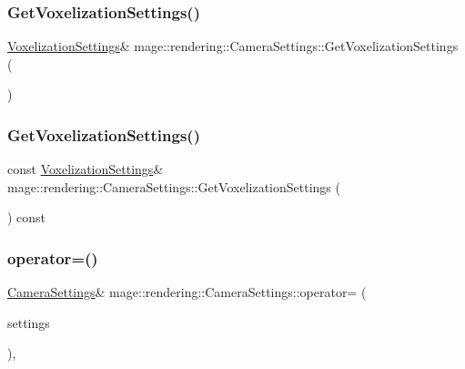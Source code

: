 \subsubsection{\texorpdfstring{Get\+Voxelization\+Settings()}{GetVoxelizationSettings()}\hspace{0.1cm}{\footnotesize\ttfamily [1/2]}}
{\footnotesize\ttfamily \mbox{\hyperlink{classmage_1_1rendering_1_1_voxelization_settings}{Voxelization\+Settings}}\& mage\+::rendering\+::\+Camera\+Settings\+::\+Get\+Voxelization\+Settings (\begin{DoxyParamCaption}{ }\end{DoxyParamCaption})\hspace{0.3cm}{\ttfamily [noexcept]}}

\mbox{\label{classmage_1_1rendering_1_1_camera_settings_a2e3906063aa11044dc325affee24aeb1}} 
\subsubsection{\texorpdfstring{Get\+Voxelization\+Settings()}{GetVoxelizationSettings()}\hspace{0.1cm}{\footnotesize\ttfamily [2/2]}}
{\footnotesize\ttfamily const \mbox{\hyperlink{classmage_1_1rendering_1_1_voxelization_settings}{Voxelization\+Settings}}\& mage\+::rendering\+::\+Camera\+Settings\+::\+Get\+Voxelization\+Settings (\begin{DoxyParamCaption}{ }\end{DoxyParamCaption}) const\hspace{0.3cm}{\ttfamily [noexcept]}}

\mbox{\label{classmage_1_1rendering_1_1_camera_settings_a8cc59c883ea4c45a6bb7e9dc728856fd}} 
\subsubsection{\texorpdfstring{operator=()}{operator=()}\hspace{0.1cm}{\footnotesize\ttfamily [1/2]}}
{\footnotesize\ttfamily \mbox{\hyperlink{classmage_1_1rendering_1_1_camera_settings}{Camera\+Settings}}\& mage\+::rendering\+::\+Camera\+Settings\+::operator= (\begin{DoxyParamCaption}\item[{const \mbox{\hyperlink{classmage_1_1rendering_1_1_camera_settings}{Camera\+Settings}} \&}]{settings }\end{DoxyParamCaption})\hspace{0.3cm}{\ttfamily [default]}, {\ttfamily [noexcept]}}

